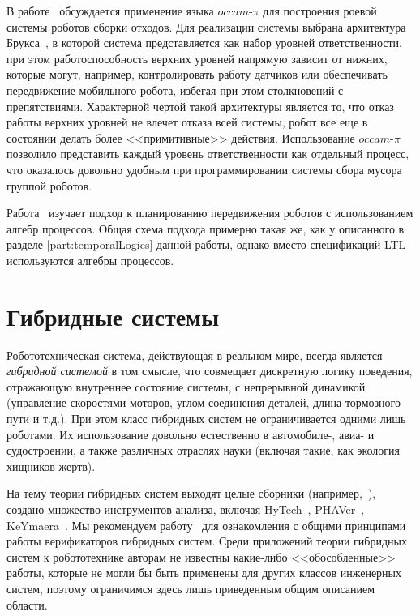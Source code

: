 \documentclass[conference]{IEEEtran}
\begin{document}
В работе~\cite{posso2011process} обсуждается применение языка $occam\mbox{-}\pi$ для 
построения роевой~\cite{csahin2005swarm} системы роботов сборки отходов. 
Для реализации системы выбрана архитектура Брукса~\cite{brooks1986layered}, в 
которой система представляется как набор уровней ответственности, при этом 
работоспособность верхних уровней напрямую зависит от нижних, которые могут, 
например, контролировать работу датчиков или обеспечивать передвижение 
мобильного робота, избегая при этом столкновений с препятствиями. Характерной 
чертой такой архитектуры является то, что отказ работы верхних уровней не влечет 
отказа всей системы, робот все еще в состоянии делать более <<примитивные>> 
действия. Использование $occam\mbox{-}\pi$ позволило представить каждый уровень 
ответственности как отдельный процесс, что оказалось довольно удобным при 
программировании системы сбора мусора группой роботов.

Работа~\cite{varricchio2014sampling} изучает подход к планированию передвижения 
роботов с использованием алгебр процессов. Общая схема подхода примерно такая 
же, как у описанного в разделе \ref{part:temporalLogics} данной работы, однако 
вместо спецификаций LTL используются алгебры процессов.

\section{Гибридные системы}
Робототехническая система, действующая в реальном мире, всегда является 
\textit{гибридной системой} в том смысле, что совмещает дискретную логику поведения, 
отражающую внутреннее состояние системы, с непрерывной динамикой (управление 
скоростями моторов, углом соединения деталей, длина тормозного пути и т.д.). 
При этом класс гибридных систем не ограничивается одними лишь роботами. Их 
использование довольно естественно в автомобиле-, авиа- и судостроении, а также 
различных отраслях науки (включая такие, как экология хищников-жертв).

На тему теории гибридных систем выходят целые сборники 
(например,~\cite{vaandrager1999hybrid, lynch2007hybrid}), 
создано множество инструментов анализа, включая HyTech~\cite{henzinger1997hytech}, 
PHAVer~\cite{frehse2005phaver}, KeYmaera~\cite{platzer2008keymaera}. 
Мы рекомендуем работу~\cite{alur1995algorithmic} для ознакомления с общими 
принципами работы верификаторов гибридных систем. Среди приложений теории 
гибридных систем к робототехнике авторам не известны какие-либо <<обособленные>> 
работы, которые не могли бы быть применены для других классов инженерных систем, 
поэтому ограничимся здесь лишь приведенным общим описанием области.
\end{document}
